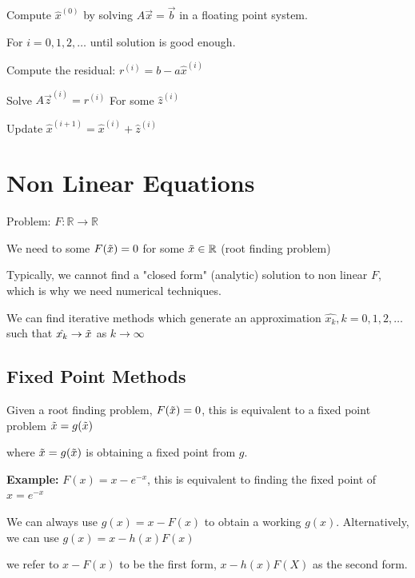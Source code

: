 \documentclass{article}
\begin{document}
Compute $\hat{x}^{(0)}$ by solving $A \vec{x} = \vec{b}$ in a floating point system.

For $i = 0, 1, 2, \dots $ until solution is good enough.

\hspace{0.5cm} Compute the residual: $r^{(i)} = b - a\hat{x}^{(i)}$

\hspace{0.5cm} Solve $A \vec{z}^{(i)} = r^{(i)}$ For some $\hat{z}^{(i)}$

\hspace{0.5cm} Update $\hat{x}^{(i + 1)} = \hat{x}^{(i)} + \hat{z}^{(i)}$

\section{Non Linear Equations}

Problem: $F: \mathbb R \to \mathbb R$

We need to some $F(\Tilde{x}) = 0$ for some $\Tilde{x} \in \mathbb R$ (root finding problem)

Typically, we cannot find a "closed form" (analytic) solution to non linear $F$, which is why we need numerical techniques. 

We can find iterative methods which generate an approximation $\hat{x_k}, k = 0, 1, 2, \dots $ such that $\hat{x_k} \to \Tilde{x}$ as $k \to \infty$

\vspace{0.2cm}

\subsection{Fixed Point Methods}

Given a root finding problem, $F(\Tilde{x}) = 0$, this is equivalent to a fixed point problem $\Tilde{x} = g(\Tilde{x})$

\vspace{0.2cm}

where $\Tilde{x} = g(\Tilde{x})$ is obtaining a fixed point from $g$.

\textbf{Example:} $F(x) = x - e^{-x}$, this is equivalent to finding the fixed point of $x = e^{-x}$ 

\vspace{0.2cm}

We can always use $g(x) = x - F(x)$ to obtain a working $g(x)$. Alternatively, we can use $g(x) = x - h(x) F(x)$

we refer to $x - F(x)$ to be the first form, $x - h(x) F(X)$ as the second form.
\end{document}
